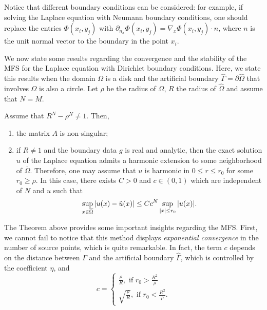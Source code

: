 Notice that different boundary conditions can be considered: for example, if solving the Laplace equation with Neumann boundary conditions, one should replace the entries \(\Phi(x_i,y_j)\) with \(\partial_{n_x}\Phi(x_i,y_j) = \nabla_x\Phi(x_i,y_j)\cdot n\), where \(n\) is the unit normal vector to the boundary in the point \(x_i\).

We now state some results regarding the convergence and the stability of the \ac{MFS} for the Laplace equation with Dirichlet boundary conditions. Here, we state this results when the domain \(\Omega\) is a disk and the artificial boundary \(\hat{\Gamma} = \partial \hat{\Omega}\) that involves \(\Omega\) is also a circle. Let \(\rho\) be the radius of \(\Omega\), \(R\) the radius of \(\hat{\Omega}\) and assume that \(N=M\).
\begin{theorem}\label{MFS_lap_conv}
    Assume that \(R^N - \rho^N \neq 1\). Then,
    \begin{enumerate}
        \item the matrix \(A\) is non-singular;
        \item if \(R \neq 1\) and the boundary data \(g\) is real and analytic, then the exact solution \(u\) of the Laplace equation admits a harmonic extension to some neighborhood of \(\overline{\Omega}\). Therefore, one may assume that \(u\) is harmonic in \(0 \leq r \leq r_0\) for some \(r_0 \geq \rho\). In this case, there exists \(C > 0\) and \(c \in (0, 1)\) which are independent of \(N\) and \(u\) such that
        \[
            \sup_{\substack{x \in \overline{\Omega}}} \abs{u(x) - \tilde{u}(x)} \leq C c^N \sup_{\substack{\abs{x}\leq r_0}}\abs{u(x)}.
        \]
    \end{enumerate}
\end{theorem}
The Theorem above provides some important insights regarding the \ac{MFS}. First, we cannot fail to notice that this method displays \textit{exponential convergence} in the number of source points, which is quite remarkable. In fact, the term \(c\) depends on the distance between \(\Gamma\) and the artificial boundary \(\hat{\Gamma}\), which is controlled by the coefficient \(\eta\), and
\[
    c = \begin{cases}
        \frac{\rho}{R}, \text{ if } r_0 > \frac{R^2}{\rho}\\
        \sqrt{\frac{\rho}{R}}, \text{ if } r_0 < \frac{R^2}{\rho}.
    \end{cases}
\]
